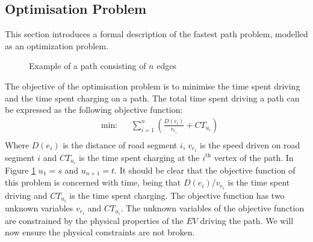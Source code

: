 \subsection{Optimisation Problem}\label{sec:optiprob}
This section introduces a formal description of the fastest path problem, modelled as an optimization problem.

\begin{figure}[h!]
\centering
    \caption{Example of a path consisting of $n$ edges} \label{fig:pathexample}
\end{figure}

The objective of the optimisation problem is to minimise the time spent driving and the time spent charging on a path. The total time spent driving a path can be expressed as the following objective function:
\begin{equation*}
\begin{aligned} &
{\text{min:}}
& & \sum_{i=1}^{n} \left(\frac{D(e_i)}{v_{e_i}} + CT_{u_i} \right)\\
\end{aligned}
\end{equation*}\label{eq:objfunction}
Where $D(e_i)$ is the distance of road segment $i$, $v_{e_i}$ is the speed driven on road segment $i$ and $CT_{u_i}$ is the time spent charging at the $i^{\text{th}}$ vertex of the path. In Figure \ref{fig:pathexample} $u_1 = s$ and $u_{n+1} = t$. It should be clear that the objective function of this problem is concerned with time, being that \( D(e_i)/v_{e_i} \) is the time spent driving and $CT_{u_i}$ is the time spent charging. The objective function has two unknown variables $v_{e_i}$ and $CT_{u_i}$. The unknown variables of the objective function are constrained by the physical properties of the $EV$ driving the path. We will now ensure the physical constraints are not broken.

